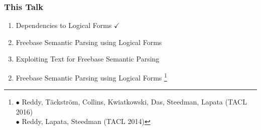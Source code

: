 \documentclass[mathserif,12pt]{beamer}
\newcommand\blfootnote[1]{%
  \begingroup
  \renewcommand\thefootnote{}\footnote{#1}%
  \addtocounter{footnote}{-1}%
  \endgroup
}
\begin{document}
\begin{frame}
\frametitle{This Talk}
\large 
\begin{enumerate}
 \item Dependencies to Logical Forms $\checkmark$
 
 \vspace{2em}
 \item Freebase Semantic Parsing using Logical Forms
 
 \vspace{2em}
 \item Exploiting Text for Freebase Semantic Parsing
\end{enumerate}
\end{frame}

\begin{frame}
\Large
\centering
\vspace{1.5em}
\begin{enumerate}
 \setcounter{enumi}{1}
 \item Freebase Semantic Parsing using Logical Forms \blfootnote{
\color{blue}
 $\bullet$ Reddy, T\"ackstr\"om, Collins, Kwiatkowski, Das, Steedman, Lapata (TACL 2016) \\
 \hspace{1.5em} $\bullet$ Reddy, Lapata, Steedman (TACL 2014)}

\end{enumerate}
\end{frame}
\end{document}
